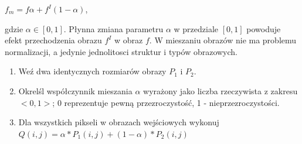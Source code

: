 \documentclass[final,a4paper,openany,12pt]{mwbk}
\begin{document}
	\begin{center}
		$f_{m} = f\alpha + f^I(1 - \alpha)$,
	\end{center}
	gdzie $\alpha \in [0,1]$. Płynna zmiana parametru $\alpha$ w przedziale $[0,1]$ powoduje efekt przechodzenia obrazu $f^I$ w obraz $f$. W mieszaniu obrazów nie ma problemu normalizacji, a jedynie jednolitosci struktur i typów obrazowych. 
	
	\begin{enumerate}	
		\item Weź dwa identycznych rozmiarów obrazy $P_{1}$ i $P_{2}$.
		\item Okrelśl współczynnik mieszania $\alpha$ wyrażony jako liczba rzeczywista z zakresu $ < 0,1 > $; 0 reprezentuje pewną przezroczystość, 1 - nieprzezroczystości. 
		\item Dla wszystkich pikseli w obrazach wejściowych wykonuj $Q(i,j) = \alpha * P_{1}(i,j) + (1 - \alpha) * P_{2}(i,j)$
	\end{enumerate}
\end{document}
